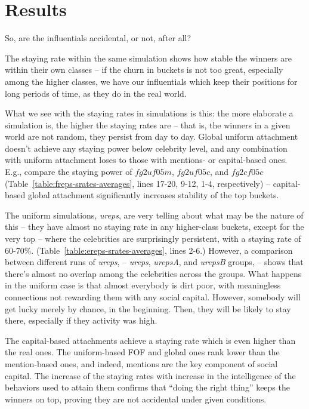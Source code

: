 \documentclass[10pt,oneside]{memoir}
\begin{document}
\pagebreak \section{Results}
\label{results}

\label{sec:simulation-results}
So, are the influentials accidental, or not, after all?


The staying rate within the same simulation shows how stable the winners are within their own classes -- if the churn in buckets is not too great, especially among the higher classes, we have our influentials which keep their positions for long periods of time, as they do in the real world.


What we see with the staying rates in simulations is this: the more elaborate a simulation is, the higher the staying rates are -- that is, the winners in a given world are not random, they persist from day to day.  Global uniform attachment doesn't achieve any staying power below celebrity level, and any combination with uniform attachment loses to those with mentions- or capital-based ones.  E.g., compare the staying power of $fg2uf05m$, $fg2uf05c$, and $fg2cf05c$ (Table~\ref{table:freps-srates-averages}, lines 17-20, 9-12, 1-4, respectively) -- capital-based global attachment significantly increases stability of the top buckets.


The uniform simulations, {\itshape ureps}, are very telling about what may be the nature of this -- they have almost no staying rate in any higher-class buckets, except for the very top -- where the celebrities are surprisingly persistent, with a staying rate of 60-70\%.  (Table~\ref{table:ereps-srates-averages}, lines 2-6.)  However, a comparison between different runs of {\itshape ureps}, -- {\itshape ureps}, {\itshape urepsA}, and {\itshape urepsB} groups, -- shows that there's almost no overlap among the celebrities across the groups.  What happens in the uniform case is that almost everybody is dirt poor, with meaningless connections not rewarding them with any social capital.  However, somebody will get lucky merely by chance, in the beginning.  Then, they will be likely to stay there, especially if they activity was high.


The capital-based attachments achieve a staying rate which is even higher than the real ones.  The uniform-based FOF and global ones rank lower than the mention-based ones, and indeed, mentions are the key component of social capital.  The increase of the staying rates with increase in the intelligence of the behaviors used to attain them confirms that ``doing the right thing'' keeps the winners on top, proving they are not accidental under given conditions.
\end{document}

